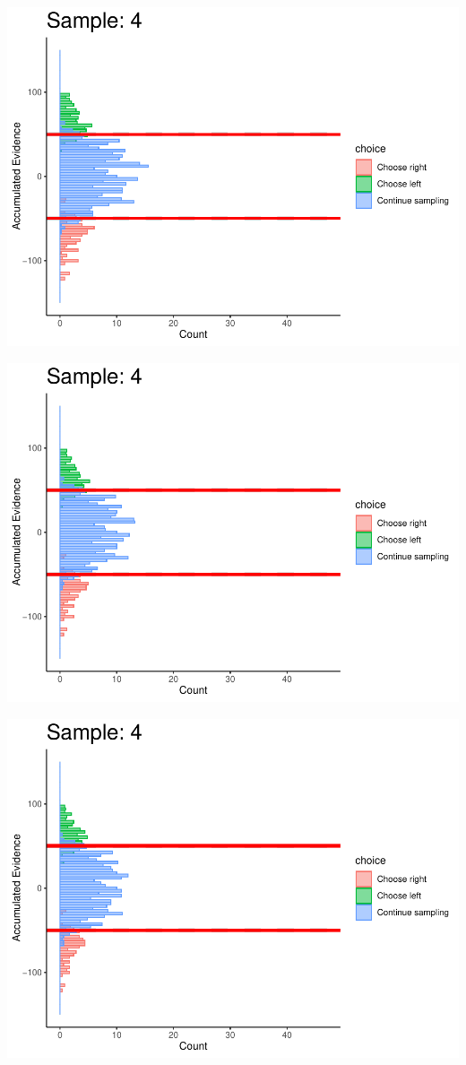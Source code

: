\documentclass[
]{book}
\begin{document}
\begin{center}\includegraphics[width=0.8\linewidth]{LateNightBayes_files/figure-latex/fixed_dcb-37} \end{center}

\begin{center}\includegraphics[width=0.8\linewidth]{LateNightBayes_files/figure-latex/fixed_dcb-38} \end{center}

\begin{center}\includegraphics[width=0.8\linewidth]{LateNightBayes_files/figure-latex/fixed_dcb-39} \end{center}
\end{document}
